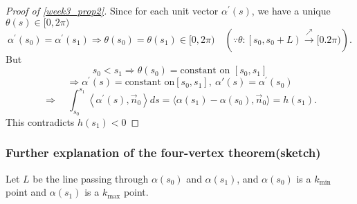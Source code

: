\begin{proof}[Proof of \cref{week3_prop2}]
    Since for each unit vector $\alpha^{\prime}(s)$, we have a unique $\theta(s)\in [0,2 \pi)$
    $$
        \alpha^{\prime}\left(s_0\right)=\alpha^{\prime}\left(s_1\right) \Rightarrow \theta\left(s_0\right)=\theta\left(s_1\right)\in [0,2 \pi) \quad\left(\because \theta:\left[s_0, s_0+L\right) \stackrel{\nearrow }{\rightarrow}[0.2 \pi)\right).
    $$
    But \[s_0<s_1 \Rightarrow \theta(s_0)= \text{constant on } \left[s_0,s_1\right]\]
    \[\Rightarrow \alpha^{\prime}(s)=\text{constant on} \left[s_0 , s_1\right] ,~\alpha'(s)=\alpha^{\prime}(s_0)\]
    \[\Rightarrow \quad \int_{s_0}^{s_1}\left\langle\alpha^{\prime}(s), \vec{n}_0\right\rangle d s=\langle\alpha(s_1)-\alpha(s_0),\vec{n}_0\rangle=h(s_1).\]
    This contradicts $h(s_1)<0$
\end{proof}
\subsubsection*{Further explanation of the four-vertex theorem(sketch)}
Let $L$ be the line passing through $\alpha(s_0)$ and $\alpha(s_1)$, and $\alpha(s_0)$ is a $k_{\min}$ point and $\alpha(s_1)$ is a $k_{\max}$ point.

